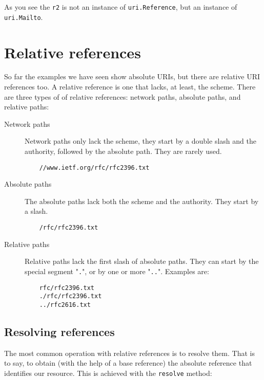 As you see the {\tt r2} is not an instance of {\tt uri.Reference}, but an
instance of {\tt uri.Mailto}.


\section{Relative references}

So far the examples we have seen show absolute URIs, but there are relative
URI references too. A relative reference is one that lacks, at least, the
scheme. There are three types of of relative references: network paths,
absolute paths, and relative paths:

\begin{description}
  \item [Network paths] Network paths only lack the scheme, they start by a
    double slash and the authority, followed by the absolute path. They are
    rarely used.

\begin{verbatim}
    //www.ietf.org/rfc/rfc2396.txt
\end{verbatim}

  \item [Absolute paths] The absolute paths lack both the scheme and the
     authority. They start by a slash.

\begin{verbatim}
    /rfc/rfc2396.txt
\end{verbatim}

  \item [Relative paths] Relative paths lack the first slash of absolute
    paths. They can start by the special segment "{\tt .}", or by one or
    more "{\tt ..}". Examples are:

\begin{verbatim}
    rfc/rfc2396.txt
    ./rfc/rfc2396.txt
    ../rfc2616.txt
\end{verbatim}

\end{description}


\subsection{Resolving references}

The most common operation with relative references is to resolve them. That
is to say, to obtain (with the help of a base reference) the absolute
reference that identifies our resource. This is achieved with the
{\tt resolve} method:

